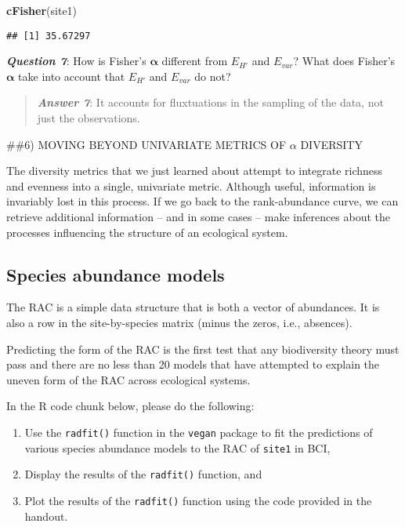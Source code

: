 \documentclass[
]{article}
\newenvironment{Shaded}{\begin{snugshade}}{\end{snugshade}}
\newcommand{\KeywordTok}[1]{\textcolor[rgb]{0.13,0.29,0.53}{\textbf{#1}}}
\newcommand{\NormalTok}[1]{#1}
\begin{document}
\begin{Shaded}
\begin{Highlighting}[]
\KeywordTok{cFisher}\NormalTok{(site1)}
\end{Highlighting}
\end{Shaded}

\begin{verbatim}
## [1] 35.67297
\end{verbatim}

\textbf{\emph{Question 7}}: How is Fisher's \(\boldsymbol\alpha\)
different from \(E_{H'}\) and \(E_{var}\)? What does Fisher's
\(\boldsymbol\alpha\) take into account that \(E_{H'}\) and \(E_{var}\)
do not?

\begin{quote}
\textbf{\emph{Answer 7}}: It accounts for fluxtuations in the sampling
of the data, not just the observations.
\end{quote}

\#\#6) MOVING BEYOND UNIVARIATE METRICS OF \(\alpha\) DIVERSITY

The diversity metrics that we just learned about attempt to integrate
richness and evenness into a single, univariate metric. Although useful,
information is invariably lost in this process. If we go back to the
rank-abundance curve, we can retrieve additional information -- and in
some cases -- make inferences about the processes influencing the
structure of an ecological system.

\hypertarget{species-abundance-models}{%
\subsection{Species abundance models}\label{species-abundance-models}}

The RAC is a simple data structure that is both a vector of abundances.
It is also a row in the site-by-species matrix (minus the zeros, i.e.,
absences).

Predicting the form of the RAC is the first test that any biodiversity
theory must pass and there are no less than 20 models that have
attempted to explain the uneven form of the RAC across ecological
systems.

In the R code chunk below, please do the following:

\begin{enumerate}
\def\labelenumi{\arabic{enumi}.}
\item
  Use the \texttt{radfit()} function in the \texttt{vegan} package to
  fit the predictions of various species abundance models to the RAC of
  \texttt{site1} in BCI,
\item
  Display the results of the \texttt{radfit()} function, and
\item
  Plot the results of the \texttt{radfit()} function using the code
  provided in the handout.
\end{enumerate}
\end{document}
